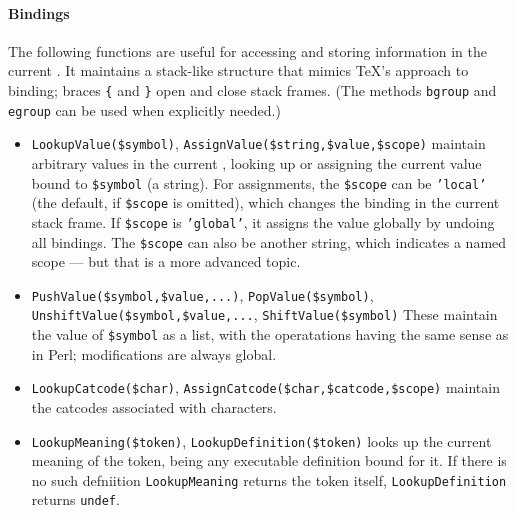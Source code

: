 \documentclass{book}
\begin{document}
\paragraph{Bindings} The following functions are useful for accessing and storing
information in the current . It maintains a stack-like structure
that mimics \TeX's approach to binding; braces \verb|{| and \verb|}| open
and close stack frames.  (The  methods \texttt{bgroup} and \texttt{egroup}
can be used when explicitly needed.)
\begin{itemize}
\item \verb|LookupValue($symbol)|, \verb|AssignValue($string,$value,$scope)|
 maintain arbitrary values in the current , looking up or assigning
 the current value  bound to \verb|$symbol| (a string).
 For assignments,  the \verb|$scope| can be \texttt{'local'}
  (the default, if \verb|$scope| is omitted),
  which changes the binding in the current stack frame.
  If \verb|$scope| is \texttt{'global'}, it assigns the value globally
  by undoing all bindings.
  The \verb|$scope| can also be another string, which indicates a named scope
   --- but that is a more advanced topic.
\item \raggedright \verb|PushValue($symbol,$value,...)|, \verb|PopValue($symbol)|,
      \verb|UnshiftValue($symbol,$value,...|, \verb|ShiftValue($symbol)|
  These maintain the value of \verb|$symbol| as a list, with the operatations
  having the same sense as in Perl; modifications are always global.
\item \verb|LookupCatcode($char)|, \verb|AssignCatcode($char,$catcode,$scope)|
  maintain the catcodes associated with characters.
\item \verb|LookupMeaning($token)|, \verb|LookupDefinition($token)|
 looks up the current meaning of the token,  being any executable definition bound for it.
 If there is no such defniition \texttt{LookupMeaning} returns the token itself, 
 \texttt{LookupDefinition} returns \texttt{undef}.
\end{itemize}
\end{document}
